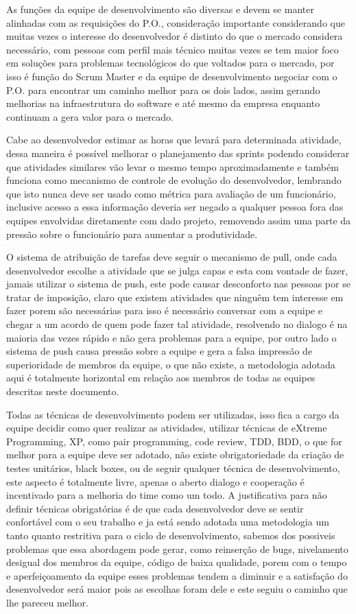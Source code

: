 \documentclass[
    article,            %
    11pt,               %
    oneside,            %
    a4paper,            %
    english,            %
    brazil,             %
    sumario=tradicional
    ]{abntex2}
\begin{document}
As funções da equipe de desenvolvimento são diversas e devem se manter alinhadas com as requisições do P.O., consideração importante considerando que muitas vezes o interesse do desenvolvedor é distinto do que o mercado considera necessário, com pessoas com perfil mais técnico
muitas vezes se tem maior foco em soluções para problemas tecnológicos do que voltados para o mercado, por isso é função do Scrum Master e da equipe de desenvolvimento negociar com o P.O. para encontrar um caminho melhor para os dois lados, assim gerando melhorias na infraestrutura
do software e até mesmo da empresa enquanto continuam a gera valor para o mercado.

Cabe ao desenvolvedor estimar as horas que levará para determinada atividade, dessa maneira é possível melhorar o planejamento das sprints podendo considerar que atividades similares vão levar o mesmo tempo aproximadamente e também funciona como mecanismo de controle de evolução
do desenvolvedor, lembrando que isto nunca deve ser usado como métrica para avaliação de um funcionário, inclusive acesso a essa informação deveria ser negado a qualquer pessoa fora das equipes envolvidas diretamente com dado projeto, removendo assim uma parte  da pressão 
sobre o funcionário para aumentar a produtividade.

O sistema de atribuição de tarefas deve seguir o mecanismo de pull, onde cada desenvolvedor escolhe a atividade que se julga capas e esta com vontade de fazer, jamais utilizar o sistema de push, este pode causar desconforto nas pessoas por se tratar de imposição, claro que existem atividades
que ninguêm tem interesse em fazer porem são necessárias para isso é necessário conversar com a equipe e chegar a um acordo de quem pode fazer tal atividade, resolvendo no dialogo é na maioria das vezes rápido e não gera problemas para a equipe, por outro lado o sistema de push causa pressão
sobre a equipe e gera a falsa impressão de superioridade de membros da equipe, o que não existe, a metodologia adotada aqui é totalmente horizontal em relação aos membros de todas as equipes descritas neste documento.

Todas as técnicas de desenvolvimento podem ser utilizadas, isso fica a cargo da equipe decidir como quer realizar as atividades, utilizar técnicas de eXtreme Programming, XP, como pair programming, code review, TDD, BDD, o que for melhor para a equipe deve ser adotado, não existe obrigatoriedade
da criação de testes unitários, black boxes, ou de seguir qualquer técnica de desenvolvimento, este aspecto é totalmente livre, apenas o aberto dialogo e cooperação é incentivado para a melhoria do time como um todo. A justificativa para não definir técnicas obrigatórias é de que cada desenvolvedor deve
se sentir confortável com o seu trabalho e ja está sendo adotada uma metodologia um tanto quanto restritiva para o ciclo de desenvolvimento, sabemos dos possiveis problemas que essa abordagem pode gerar, como reinserção de bugs, nivelamento desigual dos membros da equipe, código de baixa qualidade, porem com o tempo e aperfeiçoamento da equipe esses problemas tendem a diminuir e a satisfação do desenvolvedor será maior pois as escolhas foram dele e este seguiu o caminho que lhe pareceu melhor.
\end{document}
